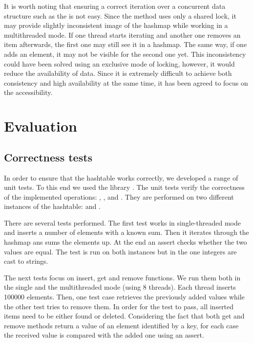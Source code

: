         It is worth noting that ensuring a correct iteration over a concurrent data structure such as the \NvmHashMap is not easy. 
        Since the \iterateMethod method uses only a shared lock, it may provide slightly inconsistent image of the hashmap while working in a multithreaded mode.
        If one thread starts iterating and another one removes an item afterwards, the first one may still see it in a hashmap. 
        The same way, if one adds an element, it may not be visible for the second one yet. 
        This inconsistency could have been solved using an exclusive mode of locking, however, it would reduce the availability of data. 
        Since it is extremely difficult to achieve both consistency and high availability at the same time, it has been agreed to focus on the accessibility.

\section{Evaluation}

    \subsection{Correctness tests}
        In order to ensure that the hashtable works correctly, we developed a range of unit tests.
        To this end we used the \GoogleTest library \cite{GoogleTest}.
        The unit tests verify the correctness of the implemented operations: \insertMethod, \getMethod, \removeMethod and \iterateMethod. 
        They are performed on two different instances of the hashtable: \integersMap and \stringsMap.
    
        There are several tests performed.
        The first test works in single-threaded mode and inserts a number of elements with a known sum.
        Then it iterates through the hashmap ans sums the elements up.
        At the end an assert checks whether the two values are equal.
        The test is run on both \NvmHashMap instances but in the \stringsMap one integers are cast to strings.
        
        The next tests focus on insert, get and remove functions. 
        We run them both in the single and the multithreaded mode (using 8 threads). 
        Each thread inserts 100000 elements. 
        Then, one test case retrieves the previously added values while the other test tries to remove them.
        In order for the test to pass, all inserted items need to be either found or deleted.
        Considering the fact that both get and remove methods return a value of an element identified by a key, for each case the received value is compared with the added one using an assert.
        
